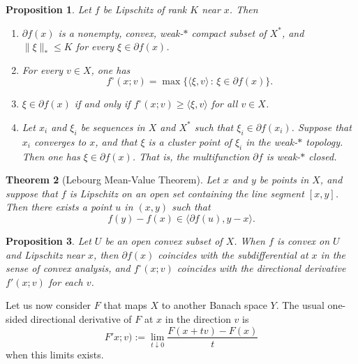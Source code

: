 \documentclass[12pt]{amsart}
\numberwithin{equation}{section}
\newtheorem{theorem}{Theorem}[section]
\newtheorem{proposition}[theorem]{Proposition}
\begin{document}
\begin{proposition}
Let $f$ be Lipschitz of rank $K$ near $x$. Then
\begin{enumerate}
    \item $\partial f(x)$ is a nonempty, convex, weak-$*$ compact subset of $X^{*}$, and $\|\xi\|_{*}\leq K$ for every $\xi \in \partial f(x)$.
    \item For every $v\in X$, one has
    \begin{equation*}
        f^{\circ}(x;v) = \max\{\langle \xi,v\rangle\,:\, \xi \in \partial f(x)\}.
    \end{equation*}
    \item $\xi \in \partial f(x)$ if and only if $f^{\circ}(x;v)\geq \langle \xi,v\rangle$ for all $v\in X$.
    \item Let $x_{i}$ and $\xi_i$ be sequences in $X$ and $X^{*}$ such that $\xi_i \in \partial f(x_i)$. Suppose that $x_i$ converges to $x$, and that $\xi$ is a cluster point of $\xi_i$ in the weak-$*$ topology. Then one has $\xi\in \partial  f(x)$. That is, the multifunction $\partial f$ is weak-$*$ closed.
\end{enumerate}
\end{proposition}

\begin{theorem}[Lebourg Mean-Value Theorem] \label{thm:MV}
Let $x$ and $y$ be points in $X$, and suppose that $f$ is Lipschitz on an open set containing the line segment $[x,y]$. Then there exists a point $u$ in $(x,y)$ such that
\begin{equation*}
    f(y) - f(x) \in \langle \partial f(u), y-x \rangle.
\end{equation*}
\end{theorem}

\begin{proposition}
Let $U$ be an open convex subset of $X$. 
When $f$ is convex on $U$ and Lipschitz near $x$, then $\partial f(x)$ coincides with the subdifferential at $x$ in the sense of convex analysis, and $f^{\circ}(x;v)$ coincides with the directional derivative $f'(x;v)$ for each $v$.
\end{proposition}

Let us now consider $F$ that maps $X$ to another Banach space $Y$. The usual one-sided directional derivative of $F$ at $x$ in the direction $v$ is 
\begin{equation*}
    F'x;v) := \lim\limits_{t\downarrow 0} \frac{F(x+tv) - F(x)}{t}
\end{equation*}
when this limits exists. 
\end{document}
